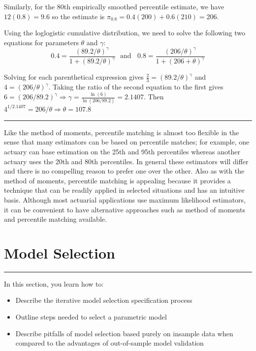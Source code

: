 \documentclass[]{book}
\providecommand{\tightlist}{%
  \setlength{\itemsep}{0pt}\setlength{\parskip}{0pt}}
\theoremstyle{definition}
\theoremstyle{definition}
\theoremstyle{definition}
\theoremstyle{remark}
\begin{document}
Similarly, for the 80th empirically smoothed percentile estimate, we
have \(12(0.8)=9.6\) so the estimate is
\(\hat{\pi}_{0.8} = 0.4(200)+0.6(210)=206\).

Using the loglogistic cumulative distribution, we need to solve the
following two equations for parameters \(\theta\) and \(\gamma\):
\[0.4=\frac{(89.2/\theta)^\gamma}{1+(89.2/\theta)^\gamma} \ \ \ \text{and} \ \ \ \   0.8=\frac{(206/\theta)^\gamma}{1+(206+\theta)^\gamma}\]

Solving for each parenthetical expression gives
\(\frac{2}{3}=(89.2/\theta)^\gamma\) and \(4=(206/\theta)^\gamma\).
Taking the ratio of the second equation to the first gives
\(6=(206/89.2)^\gamma \Rightarrow \gamma=\frac{\ln(6)}{\ln(206/89.2)} = 2.1407\).
Then \(4^{1/2.1407}=206/\theta \Rightarrow \theta=107.8\)

\begin{center}\rule{0.5\linewidth}{\linethickness}\end{center}

Like the method of moments, percentile matching is almost too flexible
in the sense that many estimators can be based on percentile matches;
for example, one actuary can base estimation on the 25th and 95th
percentiles whereas another actuary uses the 20th and 80th percentiles.
In general these estimators will differ and there is no compelling
reason to prefer one over the other. Also as with the method of moments,
percentile matching is appealing because it provides a technique that
can be readily applied in selected situations and has an intuitive
basis. Although most actuarial applications use maximum likelihood
estimators, it can be convenient to have alternative approaches such as
method of moments and percentile matching available.

\section{Model Selection}\label{S:MS:ModelSelection}

\begin{center}\rule{0.5\linewidth}{\linethickness}\end{center}

In this section, you learn how to:

\begin{itemize}
\tightlist
\item
  Describe the iterative model selection specification process
\item
  Outline steps needed to select a parametric model
\item
  Describe pitfalls of model selection based purely on insample data
  when compared to the advantages of out-of-sample model validation
\end{itemize}
\end{document}
